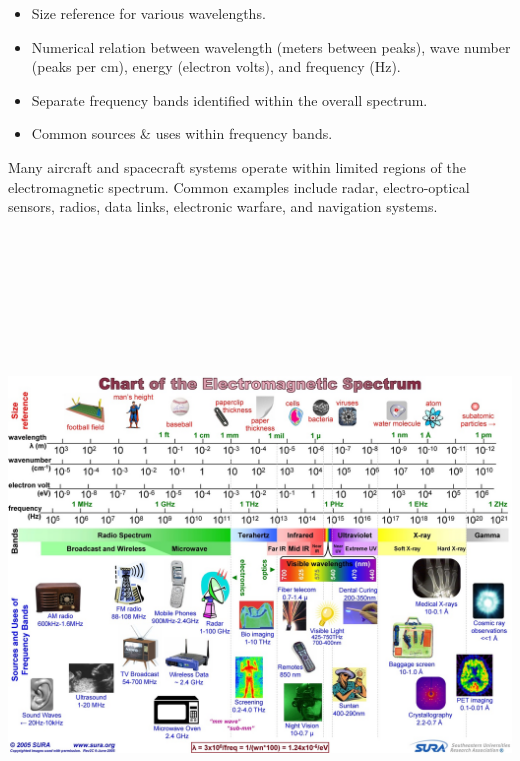 \documentclass[
]{book}
\providecommand{\tightlist}{%
  \setlength{\itemsep}{0pt}\setlength{\parskip}{0pt}}
\begin{document}
\begin{itemize}
\tightlist
\item
  Size reference for various wavelengths.
\item
  Numerical relation between wavelength (meters between peaks), wave number
  (peaks per cm), energy (electron volts), and frequency (Hz).
\item
  Separate frequency bands identified within the overall spectrum.
\item
  Common sources \& uses within frequency bands.
\end{itemize}

Many aircraft and spacecraft systems operate within limited regions of the
electromagnetic spectrum. Common examples include radar, electro-optical
sensors, radios, data links, electronic warfare, and navigation systems.

\includegraphics[width=9.27749in,height=6.9492in]{media/19/image2.jpeg}
\end{document}
